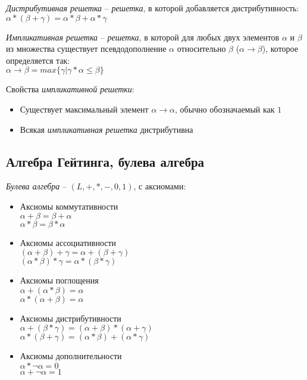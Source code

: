\emph{Дистрибутивная решетка} -- \emph{решетка}, в которой добавляется дистрибутивность:\\
$\alpha * (\beta + \gamma) = \alpha * \beta + \alpha * \gamma$

\emph{Импликативная решетка} -- \emph{решетка}, в которой для любых двух элементов $\alpha$ и $\beta$ из множества существует псевдодополнение $\alpha$ относительно $\beta$ ($\alpha \rightarrow \beta$), которое определяется так:\\
$\alpha \rightarrow \beta = max \lbrace \gamma \vert \gamma * \alpha \leq \beta \rbrace$

Свойства \emph{импликативной решетки}:
\begin{itemize}
\item Существует максимальный элемент $\alpha \rightarrow \alpha$, обычно обозначаемый как $1$
\item Всякая \emph{импликативная решетка} дистрибутивна
\end{itemize}

\subsection{Алгебра Гейтинга, булева алгебра}
\label{sec-5-4}
\emph{Булева алгебра} -- $(L, +, *, -, 0, 1)$, с аксиомами:
\begin{itemize}
\item Аксиомы коммутативности\\
$\alpha + \beta = \beta + \alpha$\\
$\alpha * \beta = \beta * \alpha$
\item Аксиомы ассоциативности\\
$(\alpha + \beta) + \gamma = \alpha + (\beta + \gamma)$\\
$(\alpha * \beta) * \gamma = \alpha * (\beta * \gamma)$
\item Аксиомы поглощения\\
$\alpha + (\alpha * \beta) = \alpha$\\
$\alpha * (\alpha + \beta) = \alpha$
\item Аксиомы дистрибутивности\\
$\alpha + (\beta * \gamma) = (\alpha + \beta) * (\alpha + \gamma)$\\
$\alpha * (\beta + \gamma) = (\alpha * \beta) + (\alpha * \gamma)$
\item Аксиомы дополнительности\\
$\alpha * \neg \alpha = 0$\\
$\alpha + \neg \alpha = 1$
\end{itemize}

